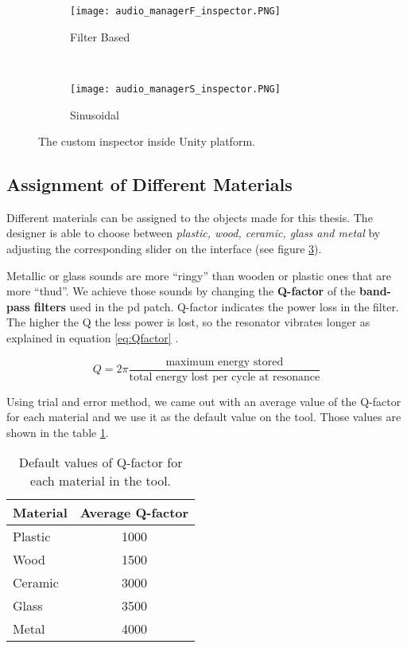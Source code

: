 \begin{figure}[H]
    \centering
    \begin{subfigure}[b]{0.45\textwidth}
        \texttt{[image: audio\_managerF\_inspector.PNG]}
        \caption{Filter Based}
        \label{fig:FB}
    \end{subfigure}
    ~ %
    \begin{subfigure}[b]{0.45\textwidth}
        \texttt{[image: audio\_managerS\_inspector.PNG]}
        \caption{Sinusoidal}
        \label{fig:sin}
    \end{subfigure}
    \caption{The custom inspector inside Unity\textsuperscript{\textregistered} platform.}\label{fig:custom_insp}
\end{figure}

\subsection{Assignment of Different Materials}
Different materials can be assigned to the objects made for this thesis. The designer is able to choose between \textit{plastic, wood, ceramic, glass and metal} by adjusting the corresponding slider on the interface (see figure \ref{fig:custom_insp}). 

Metallic or glass sounds are more ``ringy'' than wooden or plastic ones that are more ``thud''. We achieve those sounds by changing the \textbf{Q-factor} of the \textbf{band-pass filters} used in the pd patch. Q-factor indicates the power loss in the filter. The higher the Q the less power is lost, so the resonator vibrates longer as explained in equation \ref{eq:Qfactor} \cite{bib:Q}.

\begin{equation}\label{eq:Qfactor}
Q=2\pi \frac{\mbox{maximum energy stored}}{\mbox{total energy lost per cycle at resonance}}
\end{equation}

Using trial and error method, we came out with an average value of the Q-factor for each material and we use it as the default value on the tool. Those values are shown in the table \ref{tab:default_Q}.

\begin{table}[H]
	\centering
    \begin{tabular}{ l  c }
    \toprule
    \textbf{Material} & \textbf{Average Q-factor} \\
    \toprule 
    Plastic & 1000 \\ 
    Wood & 1500 \\ 
    Ceramic & 3000 \\ 
    Glass & 3500 \\ 
    Metal & 4000 \\
    \bottomrule
    \end{tabular}
    \caption{Default values of Q-factor for each material in the tool.}
    \label{tab:default_Q}
\end{table} 

